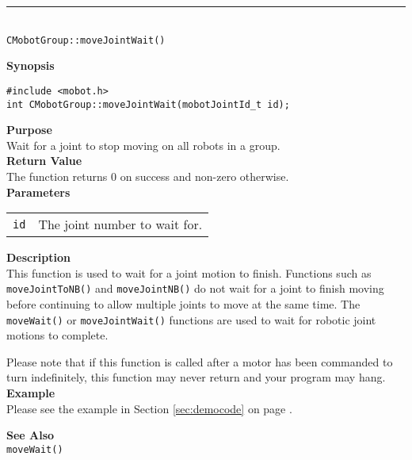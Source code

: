 \noindent
\vspace{5pt}
\rule{4.5in}{0.015in}\\
\noindent
{\LARGE \texttt{CMobotGroup::moveJointWait()}}\\
{}

\noindent
{\bf Synopsis}
\vspace{-8pt}
\begin{verbatim}
#include <mobot.h>
int CMobotGroup::moveJointWait(mobotJointId_t id);
\end{verbatim}

\noindent
{\bf Purpose}\\
Wait for a joint to stop moving on all robots in a group.\\

\noindent
{\bf Return Value}\\
The function returns 0 on success and non-zero otherwise.\\

\noindent
{\bf Parameters}
\vspace{-0.1in}
\begin{description}
\item               
\begin{tabular}{p{10 mm}p{145 mm}}
\texttt{id} & The joint number to wait for. \\
\end{tabular}
\end{description}

\noindent
{\bf Description}\\
This function is used to wait for a joint motion to finish. Functions such as
\texttt{moveJointToNB()} and \texttt{moveJointNB()} do not wait for a joint to finish
moving before continuing to allow multiple joints to move at the same time. The
\texttt{moveWait()} or \texttt{moveJointWait()} functions are used to wait for
robotic joint motions to complete.

Please note that if this function is called after a motor has been commanded to
turn indefinitely, this function may never return and your program may hang.\\

\noindent
{\bf Example}\\
Please see the example in Section \ref{sec:democode} on page \pageref{sec:democode}.\\
\noindent

\noindent
{\bf See Also}\\
\texttt{moveWait()}

